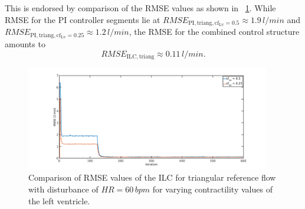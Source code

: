 This is endorsed by comparison of the RMSE values as shown in \figurename~\ref{fig:RMSE_dist_triang_var_cf}. While RMSE for the PI controller segments lie at $RMSE_{\mathrm{PI,triang,cf_{\mathrm{Lv}}=0.5}}\approx 1.9\, l/min$ and $RMSE_{\mathrm{PI,triang,cf_{\mathrm{Lv}}=0.25}}\approx 1.2\, l/min$, the RMSE for the combined control structure amounts to
\begin{equation}
  RMSE_{\mathrm{ILC,triang}}\approx 0.11\, l/min.
\end{equation}
\begin{figure}[ht!]
  \centering
  \includegraphics[width=0.95\textwidth]{images/chapt_5/ILC/RMSE_dist_triang_var_cf.pdf}
  \caption[RMSE Comparison of ILC at triangular reference flow for varying left ventricular contractilities]{Comparison of RMSE values of the ILC for triangular reference flow with disturbance of $HR=60\,bpm$ for varying contractility values of the left ventricle.}
  \label{fig:RMSE_dist_triang_var_cf}
\end{figure}

